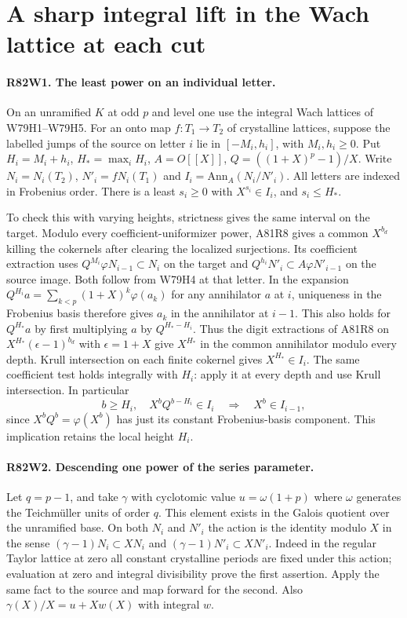 \section{A sharp integral lift in the Wach lattice at each cut}

\paragraph{R82W1. The least power on an individual letter.}
On an unramified $K$ at odd $p$ and level one use the integral Wach
lattices of W79H1--W79H5. For an onto map $f:T_1\to T_2$ of
crystalline lattices, suppose the labelled jumps of the source on
letter $i$ lie in $[-M_i,h_i]$, with $M_i,h_i\ge0$. Put
$H_i=M_i+h_i$, $H_* =\max_i H_i$, $A=O[[X]]$,
$Q=((1+X)^p-1)/X$. Write $N_i=N_i(T_2)$, $N'_i=fN_i(T_1)$
and $I_i=\mathrm{Ann}_A(N_i/N'_i)$. All letters are indexed in
Frobenius order. There is a least $s_i\ge0$ with $X^{s_i}\in I_i$,
and $s_i\le H_*$.

To check this with varying heights, strictness gives the same
interval on the target. Modulo every coefficient-uniformizer
power, A81R8 gives a common $X^{b_d}$ killing the cokernels
after clearing the localized surjections. Its coefficient
extraction uses $Q^{M_i}\varphi N_{i-1}\subset N_i$ on the target
and $Q^{h_i}N'_i\subset A\varphi N'_{i-1}$ on the source image.
Both follow from W79H4 at that letter. In the expansion
$Q^{H_i}a=\sum_{k<p}(1+X)^k\varphi(a_k)$ for any annihilator
$a$ at $i$, uniqueness in the Frobenius basis therefore gives
$a_k$ in the annihilator at $i-1$. This also holds for
$Q^{H_*}a$ by first multiplying $a$ by $Q^{H_*-H_i}$.
Thus the digit extractions of A81R8 on $X^{H_*}(\epsilon-1)^{b_d}$
with $\epsilon=1+X$ give $X^{H_*}$ in the common annihilator modulo every depth.
Krull intersection on each finite cokernel gives $X^{H_*}\in I_i$.
The same coefficient test holds integrally with $H_i$: apply it at
every depth and use Krull intersection. In particular
\[
       b\ge H_i,\quad X^bQ^{b-H_i}\in I_i
                      \quad\Longrightarrow\quad X^b\in I_{i-1},
\]
since $X^bQ^b=\varphi(X^b)$ has just its constant Frobenius-basis
component. This implication retains the local height $H_i$.

\paragraph{R82W2. Descending one power of the series parameter.}
Let $q=p-1$, and take $\gamma$ with cyclotomic value
$u=\omega(1+p)$ where $\omega$ generates the Teichm\"uller
units of order $q$. This element exists in the Galois quotient
over the unramified base. On both $N_i$ and $N'_i$ the action
is the identity modulo $X$ in the sense
$(\gamma-1)N_i\subset XN_i$ and $(\gamma-1)N'_i\subset XN'_i$.
Indeed in the regular Taylor lattice at zero all constant
crystalline periods are fixed under this action; evaluation at zero
and integral divisibility prove the first assertion. Apply the same
fact to the source and map forward for the second.
Also $\gamma(X)/X=u+Xw(X)$ with integral $w$.

